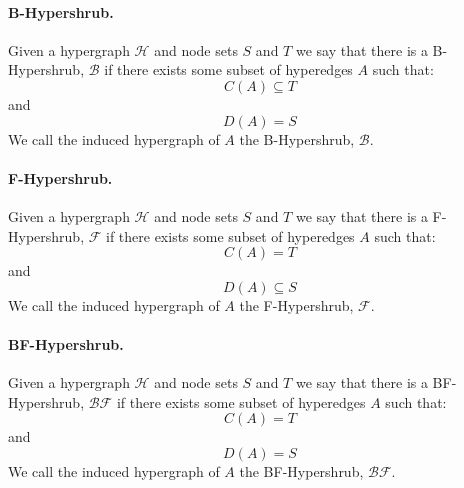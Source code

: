 \documentclass[12pt,twoside]{reedthesis}
\theoremstyle{definition}
\begin{document}
\paragraph{B-Hypershrub.}Given a hypergraph $\mathcal{H}$ and node sets $S$ and $T$ we say that there is a B-Hypershrub, $\mathcal{B}$ if there exists some subset of hyperedges $A$ such that:
\begin{equation*}
  C(A) \subseteq T
\end{equation*}
and
\begin{equation*}
  D(A) = S
\end{equation*}
We call the induced hypergraph of $A$ the B-Hypershrub, $\mathcal{B}$.\par
\paragraph{F-Hypershrub.}Given a hypergraph $\mathcal{H}$ and node sets $S$ and $T$ we say that there is a F-Hypershrub, $\mathcal{F}$ if there exists some subset of hyperedges $A$ such that:
\begin{equation*}
  C(A) = T
\end{equation*}
and
\begin{equation*}
  D(A) \subseteq S
\end{equation*}
We call the induced hypergraph of $A$ the F-Hypershrub, $\mathcal{F}$.\par
\paragraph{BF-Hypershrub.}Given a hypergraph $\mathcal{H}$ and node sets $S$ and $T$ we say that there is a BF-Hypershrub, $\mathcal{BF}$ if there exists some subset of hyperedges $A$ such that:
\begin{equation*}
  C(A) = T
\end{equation*}
and
\begin{equation*}
  D(A) = S
\end{equation*}
We call the induced hypergraph of $A$ the BF-Hypershrub, $\mathcal{BF}$.\par
\end{document}

